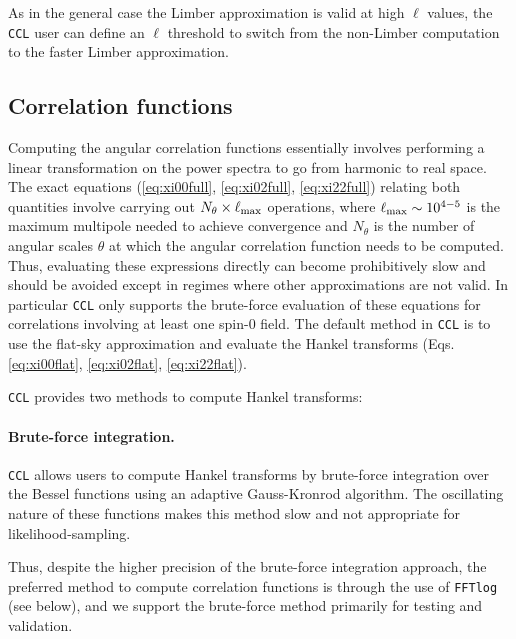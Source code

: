 \documentclass[\docopts]{\docclass}
\newcommand{\ccl}{{\tt CCL}\xspace}
\begin{document}
As in the general case the Limber approximation is valid at high $\ell$ values, the \ccl user can define an $\ell$ threshold to switch from the non-Limber computation to the faster Limber approximation.
 


\subsection{Correlation functions}

Computing the angular correlation functions essentially involves performing a linear transformation on the power spectra to go from harmonic to real space. The exact equations (\ref{eq:xi00full}, \ref{eq:xi02full}, \ref{eq:xi22full}) relating both quantities involve carrying out $N_\theta\times\ell_{\rm max}$ operations, where $\ell_{\rm max}\sim 10^{4-5}$ is the maximum multipole needed to achieve convergence and $N_\theta$ is the number of angular scales $\theta$ at which the angular correlation function needs to be computed. Thus, evaluating these expressions directly can become prohibitively slow and should be avoided except in regimes where other approximations are not valid. In particular \ccl only supports the brute-force evaluation of these equations for correlations involving at least one spin-0 field. The default method in \ccl is to use the flat-sky approximation and evaluate the Hankel transforms (Eqs. \ref{eq:xi00flat}, \ref{eq:xi02flat}, \ref{eq:xi22flat}).

\ccl provides two methods to compute Hankel transforms:

\paragraph{\bf Brute-force integration.} \ccl allows users to compute Hankel transforms by brute-force integration over the Bessel functions using an adaptive Gauss-Kronrod algorithm. The oscillating nature of these functions makes this method slow and not appropriate for likelihood-sampling.

Thus, despite the higher precision of the brute-force integration approach, the preferred method to compute correlation functions is through the use of {\tt FFTlog} (see below), and we support the brute-force method primarily for testing and validation.
\end{document}
